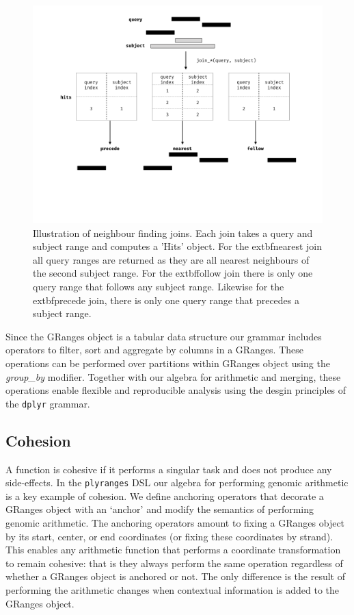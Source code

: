 \documentclass[10pt,letterpaper]{article}
\begin{document}
\begin{figure}

{\centering \includegraphics[width=400pt]{diagrams/diagrams-003} 

}

\caption{Illustration of neighbour finding joins. Each join takes a query and subject range and computes a 'Hits' object. For the   extbf{nearest} join all query ranges are returned as they are all nearest neighbours of the second subject range. For the   extbf{follow} join there is only one query range that follows any subject range. Likewise for the   extbf{precede} join, there is only one query range that precedes a subject range.}\label{fig:nn-fig}
\end{figure}

Since the GRanges object is a tabular data structure our grammar
includes operators to filter, sort and aggregate by columns in a
GRanges. These operations can be performed over partitions within
GRanges object using the \emph{group\_by} modifier. Together with our
algebra for arithmetic and merging, these operations enable flexible and
reproducible analysis using the desgin principles of the \texttt{dplyr}
grammar.

\hypertarget{cohesion}{%
\subsection{Cohesion}\label{cohesion}}

A function is cohesive if it performs a singular task and does not
produce any side-effects. In the \texttt{plyranges} DSL our algebra for
performing genomic arithmetic is a key example of cohesion. We define
anchoring operators that decorate a GRanges object with an `anchor' and
modify the semantics of performing genomic arithmetic. The anchoring
operators amount to fixing a GRanges object by its start, center, or end
coordinates (or fixing these coordinates by strand). This enables any
arithmetic function that performs a coordinate transformation to remain
cohesive: that is they always perform the same operation regardless of
whether a GRanges object is anchored or not. The only difference is the
result of performing the arithmetic changes when contextual information
is added to the GRanges object.
\end{document}
